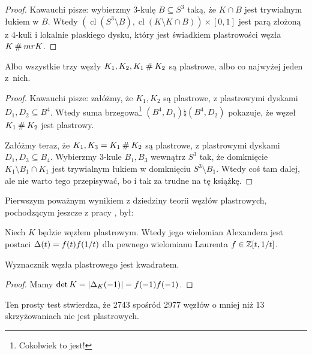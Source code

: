 \begin{proof}
    Kawauchi \cite[s. 155]{kawauchi96} pisze: wybierzmy 3-kulę $B \subseteq S^3$ taką, że $K \cap B$ jest trywialnym łukiem w $B$.
    Wtedy $(\operatorname{cl} (S^3 \setminus B), \operatorname{cl} (K \setminus K \cap B)) \times [0,1]$ jest parą złożoną z 4-kuli i lokalnie płaskiego dysku, który jest świadkiem plastrowości węzła $K \mathbin{\#} mr K$.
\end{proof}

\begin{proposition}
    Albo wszystkie trzy węzły $K_1, K_2, K_1 \mathbin{\#} K_2$ są plastrowe, albo co najwyżej jeden z~nich.
\end{proposition}

\begin{proof}
    Kawauchi \cite[s. 155]{kawauchi96} pisze: załóżmy, że $K_1, K_2$ są plastrowe, z plastrowymi dyskami $D_1, D_2 \subseteq B^4$.
    Wtedy suma brzegowa\footnote{Cokolwiek to jest!} $(B^4, D_1) \natural (B^4, D_2)$ pokazuje, że węzeł $K_1 \mathbin{\#} K_2$ jest plastrowy.

    Załóżmy teraz, że $K_1, K_3 = K_1 \mathbin{\#} K_2$ są plastrowe, z plastrowymi dyskami $D_1, D_3 \subseteq B_4$.
    Wybierzmy 3-kule $B_1, B_3$ wewnątrz $S^3$ tak, że domknięcie $K_1 \setminus B_1 \cap K_1$ jest trywialnym łukiem w domknięciu $S^3 \setminus B_1$.
    Wtedy coś tam dalej, ale nie warto tego przepisywać, bo i tak za trudne na tę książkę.
\end{proof}

Pierwszym poważnym wynikiem z dziedziny teorii węzłów plastrowych, pochodzącym jeszcze z pracy \cite{fox66}, był:

\begin{proposition}
%
    Niech $K$ będzie węzłem plastrowym.
    Wtedy jego wielomian Alexandera jest postaci $\Delta(t) = f(t) f(1/t)$ dla pewnego wielomianu Laurenta $f \in \mathbb Z[t, 1/t]$.
\end{proposition}

\begin{corollary}
    Wyznacznik węzła plastrowego jest kwadratem.
\end{corollary}

\begin{proof}
    Mamy $\det K = |\Delta_K(-1)| = f(-1) f(-1)$.
\end{proof}

Ten prosty test stwierdza, że 2743 spośród 2977 węzłów o mniej niż 13 skrzyżowaniach nie jest plastrowych.

